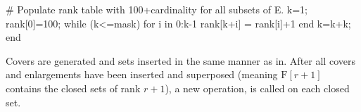 \begin{jllisting}
  # Populate rank table with 100+cardinality for all subsets of E.
  k=1; rank[0]=100;
  while (k<=mask)
    for i in 0:k-1 rank[k+i] = rank[i]+1 end
    k=k+k;
  end
\end{jllisting}

Covers are generated and sets inserted in the same manner as in\linebreak{}. After all covers and enlargements have been inserted and superposed (meaning $\mathrm{F}[r+1]$ contains the closed sets of rank $r+1$), a new operation,  is called on each closed set.

\skelpars[4]